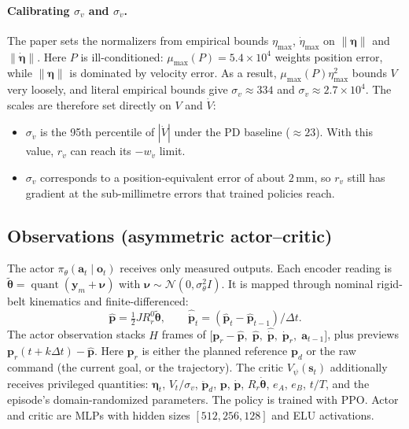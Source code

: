 \paragraph{Calibrating $\sigma_v$ and $\sigma_{\dot v}$.}
The paper sets the normalizers from empirical bounds $\eta_{\max}$, $\dot\eta_{\max}$ on $\|\boldsymbol\eta\|$ and $\|\dot{\boldsymbol\eta}\|$.
Here $P$ is ill-conditioned: $\mu_{\max}(P) = 5.4\times10^4$ weights position error, while $\|\boldsymbol\eta\|$ is dominated by velocity error.
As a result, $\mu_{\max}(P)\eta_{\max}^2$ bounds $V$ very loosely, and literal empirical bounds give $\sigma_v \approx 334$ and $\sigma_{\dot v} \approx 2.7\times10^4$.
The scales are therefore set directly on $V$ and $\dot V$:
\begin{itemize}
  \item $\sigma_{\dot v}$ is the 95th percentile of $|\dot V|$ under the PD baseline ($\approx 23$). With this value, $r_{\dot v}$ can reach its $-w_{\dot v}$ limit.
  \item $\sigma_v$ corresponds to a position-equivalent error of about $2\,\mathrm{mm}$, so $r_v$ still has gradient at the sub-millimetre errors that trained policies reach.
\end{itemize}

\subsection*{Observations (asymmetric actor--critic)}
The actor $\pi_\theta(\mathbf{a}_t \mid \mathbf{o}_t)$ receives only measured outputs.
Each encoder reading is $\tilde{\boldsymbol\theta} = \operatorname{quant}(\mathbf{y}_m + \boldsymbol\nu)$ with $\boldsymbol\nu \sim \mathcal{N}(0, \sigma_\theta^2 I)$.
It is mapped through nominal rigid-belt kinematics and finite-differenced:
\begin{equation}
\hat{\mathbf{p}} = \tfrac12 J R_r^{0} \tilde{\boldsymbol\theta}, \qquad
\hat{\dot{\mathbf{p}}}_t = (\hat{\mathbf{p}}_t - \hat{\mathbf{p}}_{t-1}) / \Delta t.
\end{equation}
The actor observation stacks $H$ frames of
$\bigl[\mathbf{p}_r - \hat{\mathbf{p}},\; \hat{\mathbf{p}},\; \hat{\dot{\mathbf{p}}},\; \dot{\mathbf{p}}_r,\; \mathbf{a}_{t-1}\bigr]$,
plus previews $\mathbf{p}_r(t + k\Delta t) - \hat{\mathbf{p}}$.
Here $\mathbf{p}_r$ is either the planned reference $\mathbf{p}_d$ or the raw command (the current goal, or the trajectory).
The critic $V_\psi(\mathbf{s}_t)$ additionally receives privileged quantities:
$\boldsymbol{\eta}_t$, $V_t / \sigma_v$, $\ddot{\mathbf{p}}_d$, $\mathbf{p}$, $\dot{\mathbf{p}}$, $R_r \dot{\boldsymbol\theta}$, $e_A$, $e_B$, $t/T$,
and the episode's domain-randomized parameters.
The policy is trained with PPO. Actor and critic are MLPs with hidden sizes $[512, 256, 128]$ and ELU activations.

